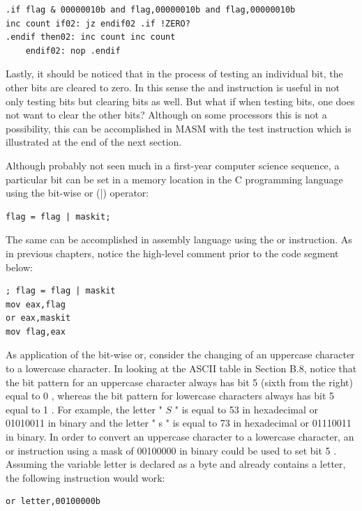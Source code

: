 \documentclass[10pt]{article}
\begin{document}
\begin{verbatim}
.if flag & 00000010b and flag,00000010b and flag,00000010b
inc count if02: jz endif02 .if !ZERO?
.endif then02: inc count inc count
    endif02: nop .endif
\end{verbatim}

Lastly, it should be noticed that in the process of testing an individual bit, the other bits are cleared to zero. In this sense the and instruction is useful in not only testing bits but clearing bits as well. But what if when testing bits, one does not want to clear the other bits? Although on some processors this is not a possibility, this can be accomplished in MASM with the test instruction which is illustrated at the end of the next section.

Although probably not seen much in a first-year computer science sequence, a particular bit can be set in a memory location in the C programming language using the bit-wise or (|) operator:

\begin{verbatim}
flag = flag | maskit;
\end{verbatim}

The same can be accomplished in assembly language using the or instruction. As in previous chapters, notice the high-level comment prior to the code segment below:

\begin{verbatim}
; flag = flag | maskit
mov eax,flag
or eax,maskit
mov flag,eax
\end{verbatim}

As application of the bit-wise or, consider the changing of an uppercase character to a lowercase character. In looking at the ASCII table in Section B.8, notice that the bit pattern for an uppercase character always has bit 5 (sixth from the right) equal to 0 , whereas the bit pattern for lowercase characters always has bit 5 equal to 1 . For example, the letter " $S$ " is equal to 53 in hexadecimal or 01010011 in binary and the letter " s " is equal to 73 in hexadecimal or 01110011 in binary. In order to convert an uppercase character to a lowercase character, an or instruction using a mask of 00100000 in binary could be used to set bit 5 . Assuming the variable letter is declared as a byte and already contains a letter, the following instruction would work:

\begin{verbatim}
or letter,00100000b
\end{verbatim}
\end{document}
